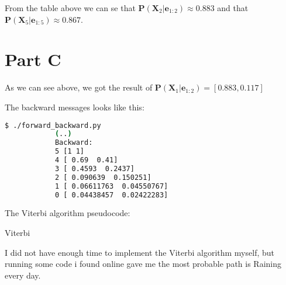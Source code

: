 \documentclass[a4paper]{article}
\begin{document}
    From the table above we can se that $\boldsymbol{P}(\boldsymbol{X}_2 | \boldsymbol{e}_{1:2}) \approx 0.883$ and that $\boldsymbol{P}(\boldsymbol{X}_5 | \boldsymbol{e}_{1:5}) \approx 0.867$.

    \section*{Part C}
        As we can see above, we got the result of $\boldsymbol{P}(\boldsymbol{X}_1 | \boldsymbol{e}_{1:2}) = [0.883, 0.117]$

        The backward messages looks like this:
        \begin{lstlisting}[language=bash]
            $ ./forward_backward.py
            (..)
            Backward:
            5 [1 1]
            4 [ 0.69  0.41]
            3 [ 0.4593  0.2437]
            2 [ 0.090639  0.150251]
            1 [ 0.06611763  0.04550767]
            0 [ 0.04438457  0.02422283]
        \end{lstlisting}

        The Viterbi algorithm pseudocode:
        \begin{algorithm}
            \caption{Viterbi}
            \begin{algorithmic}[1]
                    \EndFor
                        \EndFor
                    \EndFor
                    \EndFor
                \EndFunction
            \end{algorithmic}
        \end{algorithm}

        I did not have enough time to implement the Viterbi algorithm myself, but running some
        code i found online gave me the most probable path is Raining every day.
\end{document}
